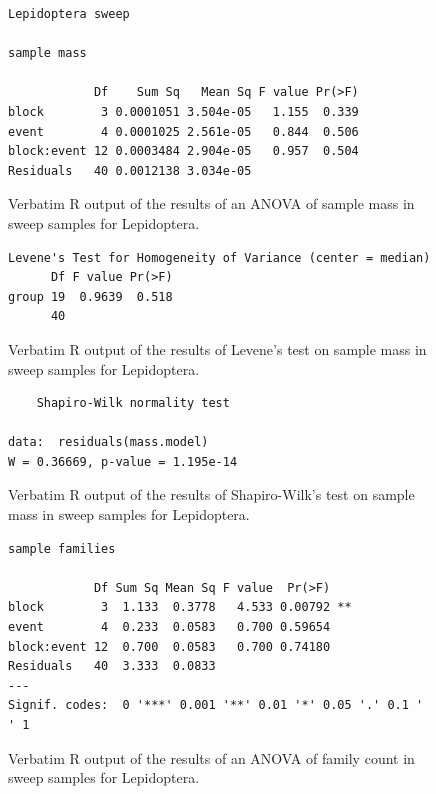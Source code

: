 \documentclass[10pt,letterpaper,twocolumn]{article}
\begin{document}
\begin{figure}[h]
	\lstset{numbers=left}
	\lstset{xleftmargin=5mm,framexleftmargin=5mm}
	\begin{lstlisting}
Lepidoptera sweep 

sample mass 

            Df    Sum Sq   Mean Sq F value Pr(>F)
block        3 0.0001051 3.504e-05   1.155  0.339
event        4 0.0001025 2.561e-05   0.844  0.506
block:event 12 0.0003484 2.904e-05   0.957  0.504
Residuals   40 0.0012138 3.034e-05               
	\end{lstlisting}
	\caption{Verbatim R output of the results of an ANOVA of sample mass in sweep samples for Lepidoptera.}
	\label{fig:sweep_lepidoptera_mass_anova}
	\smallskip
	\nointerlineskip
	\hrulefill
\end{figure}

\begin{figure}[h]
	\lstset{numbers=left}
	\lstset{xleftmargin=5mm,framexleftmargin=5mm}
	\begin{lstlisting}
Levene's Test for Homogeneity of Variance (center = median)
      Df F value Pr(>F)
group 19  0.9639  0.518
      40               
	\end{lstlisting}
	\caption{Verbatim R output of the results of Levene's test on sample mass in sweep samples for Lepidoptera.}
	\label{fig:sweep_lepidoptera_mass_levene}
	\smallskip
	\nointerlineskip
	\hrulefill
\end{figure}

\begin{figure}[h]
	\lstset{numbers=left}
	\lstset{xleftmargin=5mm,framexleftmargin=5mm}
	\begin{lstlisting}
	Shapiro-Wilk normality test

data:  residuals(mass.model)
W = 0.36669, p-value = 1.195e-14
	\end{lstlisting}
	\caption{Verbatim R output of the results of Shapiro-Wilk's test on sample mass in sweep samples for Lepidoptera.}
	\label{fig:sweep_lepidoptera_mass_shapiro}
	\smallskip
	\nointerlineskip
	\hrulefill
\end{figure}

\begin{figure}[h]
	\lstset{numbers=left}
	\lstset{xleftmargin=5mm,framexleftmargin=5mm}
	\begin{lstlisting}
sample families 

            Df Sum Sq Mean Sq F value  Pr(>F)   
block        3  1.133  0.3778   4.533 0.00792 **
event        4  0.233  0.0583   0.700 0.59654   
block:event 12  0.700  0.0583   0.700 0.74180   
Residuals   40  3.333  0.0833                   
---
Signif. codes:  0 '***' 0.001 '**' 0.01 '*' 0.05 '.' 0.1 ' ' 1
	\end{lstlisting}
	\caption{Verbatim R output of the results of an ANOVA of family count in sweep samples for Lepidoptera.}
	\label{fig:sweep_lepidoptera_family_anova}
	\smallskip
	\nointerlineskip
	\hrulefill
\end{figure}
\end{document}
